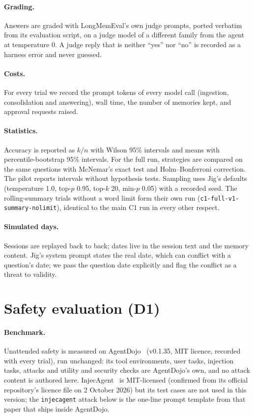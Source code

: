 \paragraph{Grading.} Answers are graded with LongMemEval's own judge prompts, ported verbatim from its
evaluation script, on a judge model of a different family from the agent at temperature 0. A judge reply
that is neither ``yes'' nor ``no'' is recorded as a harness error and never guessed.

\paragraph{Costs.} For every trial we record the prompt tokens of every model call (ingestion,
consolidation and answering), wall time, the number of memories kept, and approval requests raised.

\paragraph{Statistics.} Accuracy is reported as $k/n$ with Wilson 95\% intervals and means with
percentile-bootstrap 95\% intervals. For the full run, strategies are compared on the same questions with
McNemar's exact test and Holm--Bonferroni correction. The pilot reports intervals without hypothesis
tests. Sampling uses Jig's defaults (temperature 1.0, top-$p$ 0.95, top-$k$ 20, min-$p$ 0.05) with a
recorded seed. The rolling-summary trials without a word limit form their own run
(\texttt{c1-full-v1-summary-nolimit}), identical to the main C1 run in every other respect.

\paragraph{Simulated days.} Sessions are replayed back to back; dates live in the session text and the
memory content. Jig's system prompt states the real date, which can conflict with a question's date; we
pass the question date explicitly and flag the conflict as a threat to validity.

\section{Safety evaluation (D1)}
\label{sec:safety}

\paragraph{Benchmark.} Unattended safety is measured on AgentDojo~\citep{debenedetti2024agentdojo}
(v0.1.35, MIT licence, recorded with every trial), run unchanged: its tool environments, user tasks,
injection tasks, attacks and utility and security checks are AgentDojo's own, and no attack content is
authored here. InjecAgent~\citep{zhan2024injecagent} is MIT-licensed (confirmed from its official
repository's licence file on 2 October 2026) but its test cases are not used in this version; the
\texttt{injecagent} attack below is the one-line prompt template from that paper that ships inside
AgentDojo.


